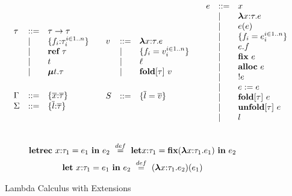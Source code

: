 \begin{figure*}
\centering
\[
\begin{array}{ccc}
\begin{array}{llll}
\tau & ::= & \tau \rightarrow \tau \\
     & \mathrel{\mid} & \{ f_i{:}\tau_i ^{i \in 1..n} \} \\
     & \mathrel{\mid} & \textbf{ref}~ \tau \\
     & \mathrel{\mid} & t \\
     & \mathrel{\mid} & \boldsymbol\mu t.\tau \\
\\[1ex]

\Gamma & ::= & \{ \overline{x} {:} \overline{\tau} \} \\

\Sigma & ::= & \{ \overline{l} {:} \overline{\tau} \} \\
\end{array}
&
\begin{array}{llll}
v    & ::= & \boldsymbol\lambda x{:}\tau . e \\
     & \mathrel{\mid} & \{ f_i = v_i ^{i \in 1..n} \}\\
     & \mathrel{\mid} & \ell \\
     & \mathrel{\mid} & \textbf{fold}[\tau]~ v \\
\\[1ex]

S & ::= & \{ \overline{l} = \overline{v} \} \\
\end{array}
&
\begin{array}{llll}
e    & ::= & x \\
     & \mathrel{\mid} & \boldsymbol\lambda x{:}\tau . e \\
     & \mathrel{\mid} & e(e) \\
     & \mathrel{\mid} & \{ f_i = e_i ^{i \in 1..n} \} \\
     & \mathrel{\mid} & e.f & \\
     & \mathrel{\mid} & \textbf{fix}~ e \\
     & \mathrel{\mid} & \textbf{alloc}~ e \\
     & \mathrel{\mid} & !e \\
     & \mathrel{\mid} & e := e \\
     & \mathrel{\mid} & \textbf{fold}[\tau]~ e \\
     & \mathrel{\mid} & \textbf{unfold}[\tau]~ e \\
     & \mathrel{\mid} & l \\
\\[1ex]
\end{array}
\\
\end{array}
\]
\[
\begin{array}{c}
\keyw{letrec}~ x{:}\tau_1 = e_1 ~\keyw{in}~ e_2 ~\buildrel {def}\over=~
\keyw{let} x{:}\tau_1 = \keyw{fix} (\boldsymbol\lambda x{:}\tau_1.e_1) ~\keyw{in}~ e_2\\[1ex]

\keyw{let}~ x{:}\tau_1 = e_1 ~\keyw{in}~ e_2 ~\buildrel {def}\over=~
(\boldsymbol\lambda x{:}\tau_1.e_2)(e_1)\\
\end{array}
\]
\caption{Lambda Calculus with Extensions~\cite{Pierce}}
\label{f-core1-syntax}
\end{figure*}